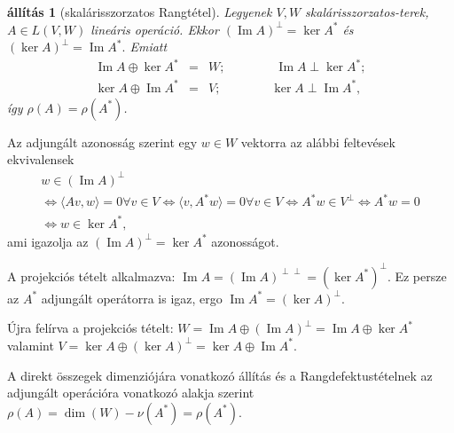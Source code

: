 \documentclass[a4paper, showtrims]{memoir}
\makeatletter
\renewenvironment{proof}[1][\proofname]
    {\par\pushQED{\qed}%
    \normalfont \topsep6\p@\@plus6\p@\relax
    \trivlist
    \item[\hskip\labelsep
        \itshape
    #1\@addpunct{:}]\ignorespaces}
    {\popQED\endtrivlist\@endpefalse}
\theoremstyle{plain}
\newtheorem{proposition}{állítás}[chapter]
\theoremstyle{remark}
\theoremstyle{definition}
\DeclareMathOperator{\im}{Im}
\newcommand{\ip}[2]{\langle#1,#2\rangle}
\makeatother
\begin{document}
\begin{proposition}[skalárisszorzatos Rangtétel]\label{pr:skrang}
	Legyenek $V,W$ skalárisszorzatos-terek, $A\in L\left( V,W \right)$ lineáris operáció.
	Ekkor
	$(\im A)^\perp=\ker A^\ast$ és
	$(\ker A)^\perp=\im A^\ast.$
	Emiatt
	\begin{eqnarray*}
		\im A\oplus\ker A^\ast&=& W;\qquad\qquad\im A\perp\ker A^\ast;\\
		\ker A\oplus\im A^\ast&=& V;\qquad\qquad\ker A\perp\im A^\ast,
	\end{eqnarray*}
	így $\rho\left( A \right)=\rho\left( A^\ast \right)$.
\end{proposition}
\begin{proof}
	Az adjungált azonosság szerint egy $w\in W$ vektorra az alábbi feltevések ekvivalensek
	\begin{multline*}
		w\in\left( \im A \right)^\perp
		\\
		\iff
		\ip{Av}{w}=0 \forall v\in V
		\iff
		\ip{v}{A^\ast w}=0 \forall v\in V
		\iff
		A^\ast w\in V^\perp
		\iff
		A^\ast w=0
		\\
		\iff
		w\in\ker A^\ast,
	\end{multline*}
	ami igazolja az $\left( \im A \right)^\perp=\ker A^\ast$ azonosságot.

	A projekciós tételt alkalmazva:
	\begin{math}
		\im A=(\im A)^{\perp\perp}=(\ker A^\ast)^\perp
	\end{math}.
	Ez persze az $A^\ast$ adjungált operátorra is igaz,
	ergo
	\begin{math}
		\im A^\ast = \left( \ker A \right)^\perp.
	\end{math}

	Újra felírva a projekciós tételt:
	\begin{math}
		W=\im A\oplus\left( \im A \right)^\perp
		=\im A\oplus\ker A^\ast
	\end{math}
	valamint
	\begin{math}
		V=\ker A\oplus\left( \ker A \right)^\perp
		=
		\ker A\oplus\im A^\ast.
	\end{math}

	A direkt összegek dimenziójára vonatkozó állítás és a Rangdefektustételnek az adjungált operációra vonatkozó alakja szerint
	\begin{math}
		\rho\left( A \right)=\dim(W)-\nu\left( A^\ast \right)=\rho\left( A^\ast \right).
	\end{math}
\end{proof}
\end{document}
